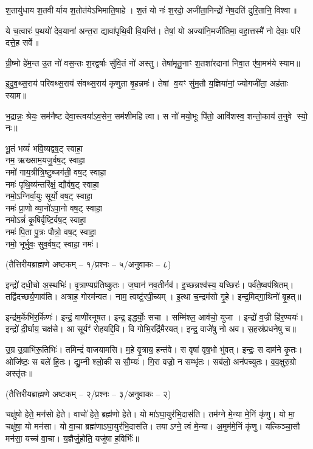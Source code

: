 श॒तायु॑धाय श॒तवीर्याय श॒तोत॑येऽभिमाति॒षाहे।
श॒तं यो नः॑ श॒रदो॒ अजी॑ता॒निन्द्रो॑ नेष॒दति॑ दुरि॒तानि॒ विश्वा॥

ये च॒त्वारः॑ प॒थयो॑ देव॒याना॑ अन्त॒रा द्यावा॑पृथि॒वी वि॒यन्ति॑।
तेषां॒ यो अज्या॑नि॒मजी॑तिमा॒ वहा॒त्तस्मै॑ नो देवाः॒ परि॑ दत्ते॒ह सर्वे॥

ग्री॒ष्मो हे॑म॒न्त उ॒त नो॑ वस॒न्तः श॒रद्व॒र्षाः सु॑वि॒तं नो॑ अस्तु।
तेषा॑मृतू॒नाꣳ श॒तशा॑रदानां निवा॒त ए॑षा॒मभ॑ये स्याम॥

इ॒दु॒व॒थ्स॒राय॑ परिवथ्स॒राय॑ संवथ्स॒राय॑ कृणुता बृ॒हन्नमः॑।
तेषां व॒यꣳ सु॑म॒तौ य॒ज्ञिया॑नां॒ ज्योगजी॑ता॒ अह॑ताः स्याम॥

भ॒द्रान्नः॒ श्रेयः॒ सम॑नैष्ट देवा॒स्त्वया॑ऽव॒सेन॒ सम॑शीमहि त्वा।
स नो॑ मयो॒भूः पि॑तो॒ आवि॑शस्व॒ शन्तो॒काय॑ त॒नुवे स्यो॒ नः॥

भू॒तं भव्यं॑ भवि॒ष्यद्वष॒ट् स्वाहा॒\\
नम॒ ऋख्साम॒यजु॒र्वष॒ट् स्वाहा॒\\
नमो॑ गाय॒त्रीत्रि॒ष्टुब्जग॑ती॒ वष॒ट् स्वाहा॒\\
नमः॑ पृथि॒व्य॑न्तरि॑क्षं॒ द्यौर्वष॒ट् स्वाहा॒\\
नमो॒ऽग्निर्वा॒युः सूर्यो॒ वष॒ट् स्वाहा॒\\
नमः॑ प्रा॒णो व्या॒नो॑ऽपा॒नो वष॒ट् स्वाहा॒\\
नमोऽन्नं॑ कृ॒षिर्वृष्टि॒र्वष॒ट् स्वाहा॒\\
नमः॑ पि॒ता पु॒त्रः पौत्रो॒ वष॒ट् स्वाहा॒\\
नमो॒ भूर्भुवः॒ सुव॒र्वष॒ट् स्वाहा॒ नमः॑।

\centerline{\scriptsize (तैत्तिरीयब्राह्मणे अष्टकम् – १/प्रश्नः – ५/अनुवाकः – ८)}

इन्द्रो॑ दधी॒चो अ॒स्थभिः॑।
वृ॒त्राण्यप्र॑तिष्कुतः।
ज॒घान॑ नव॒तीर्नव॑।
इ॒च्छन्नश्व॑स्य॒ यच्छिरः॑।
पर्व॑ते॒ष्वप॑श्रितम्।
तद्वि॑दच्छर्य॒णाव॑ति।
अत्राह॒ गोरम॑न्वत।
नाम॒ त्वष्टु॑रपी॒च्यम्।
इ॒त्था च॒न्द्रम॑सो गृ॒हे।
इन्द्र॒मिद्गा॒थिनो॑ बृ॒हत्॥

इन्द्र॑म॒र्केभि॑र॒र्किणः॑।
इन्द्रं॒ वाणी॑रनूषत।
इन्द्र॒ इद्धर्योः॒ सचा।
सम्मि॑श्ल॒ आव॑चो॒ युजा।
इन्द्रो॑ व॒ज्री हि॑र॒ण्ययः॑।
इन्द्रो॑ दी॒र्घाय॒ चक्ष॑से।
आ सूर्यꣳ॑ रोहयद्दि॒वि।
वि गोभि॒रद्रि॑मैरयत्।
इन्द्र॒ वाजे॑षु नो अव।
स॒हस्र॑प्रधनेषु च॥

उ॒ग्र उ॒ग्राभि॑रू॒तिभिः॑।
तमिन्द्रं॑ वाजयामसि।
म॒हे वृ॒त्राय॒ हन्त॑वे।
स वृषा॑ वृष॒भो भु॑वत्।
इन्द्रः॒ स दाम॑ने कृ॒तः।
ओजि॑ष्ठः॒ स बले॑ हि॒तः।
द्यु॒म्नी श्लो॒की स सौ॒म्यः॑।
गि॒रा वज्रो॒ न सम्भृ॑तः।
सब॑लो॒ अन॑पच्युतः।
व॒व॒क्षुरु॒ग्रो अस्तृ॑तः॥

\centerline{\scriptsize (तैत्तिरीयब्राह्मणे अष्टकम् – २/प्रश्नः – ३/अनुवाकः – २)}
चक्षु॑षो हेते॒ मन॑सो हेते।
वाचो॑ हेते॒ ब्रह्म॑णो हेते।
यो मा॑ऽघा॒युर॑भि॒दास॑ति।
तम॑ग्ने मे॒न्या मे॒निं कृ॑णु।
यो मा॒ चक्षु॑षा॒ यो मन॑सा।
यो वा॒चा ब्रह्म॑णाऽघा॒युर॑भि॒दास॑ति।
तयाऽग्ने॒ त्वं मे॒न्या।
अ॒मुम॑मे॒निं कृ॑णु।
यत्किञ्चा॒सौ मन॑सा॒ यच्च॑ वा॒चा।
य॒ज्ञैर्जु॒होति॒ यजु॑षा ह॒विर्भिः॑॥

